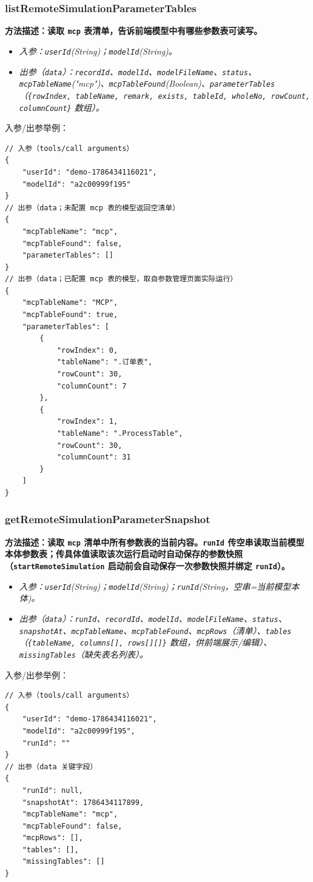 \subsubsection{listRemoteSimulationParameterTables}
\bf{方法描述}：读取 \texttt{mcp} 表清单，告诉前端模型中有哪些参数表可读写。
\begin{itemize}
	\item \it{入参}：\texttt{userId}(String)；\texttt{modelId}(String)。
	\item \it{出参}（\texttt{data}）：\texttt{recordId}、\texttt{modelId}、\texttt{modelFileName}、\texttt{status}、\texttt{mcpTableName}("mcp")、\texttt{mcpTableFound}(Boolean)、\texttt{parameterTables}（\texttt{\{rowIndex, tableName, remark, exists, tableId, wholeNo, rowCount, columnCount\}} 数组）。
\end{itemize}
入参/出参举例：
\begin{lstlisting}
// 入参（tools/call arguments）
{
    "userId": "demo-1786434116021",
    "modelId": "a2c00999f195"
}
// 出参（data；未配置 mcp 表的模型返回空清单）
{
    "mcpTableName": "mcp",
    "mcpTableFound": false,
    "parameterTables": []
}
// 出参（data；已配置 mcp 表的模型，取自参数管理页面实际运行）
{
    "mcpTableName": "MCP",
    "mcpTableFound": true,
    "parameterTables": [
        {
            "rowIndex": 0,
            "tableName": ".订单表",
            "rowCount": 30,
            "columnCount": 7
        },
        {
            "rowIndex": 1,
            "tableName": ".ProcessTable",
            "rowCount": 30,
            "columnCount": 31
        }
    ]
}
\end{lstlisting}\vspace{-30pt}

\subsubsection{getRemoteSimulationParameterSnapshot}
\bf{方法描述}：读取 \texttt{mcp} 清单中所有参数表的当前内容。\texttt{runId} 传空串读取当前模型本体参数表；传具体值读取该次运行启动时自动保存的参数快照（\texttt{startRemoteSimulation} 启动前会自动保存一次参数快照并绑定 \texttt{runId}）。
\begin{itemize}
	\item \it{入参}：\texttt{userId}(String)；\texttt{modelId}(String)；\texttt{runId}(String，空串=当前模型本体)。
	\item \it{出参}（\texttt{data}）：\texttt{runId}、\texttt{recordId}、\texttt{modelId}、\texttt{modelFileName}、\texttt{status}、\texttt{snapshotAt}、\texttt{mcpTableName}、\texttt{mcpTableFound}、\texttt{mcpRows}（清单）、\texttt{tables}（\texttt{\{tableName, columns[], rows[][]\}} 数组，供前端展示/编辑）、\texttt{missingTables}（缺失表名列表）。
\end{itemize}
入参/出参举例：
\begin{lstlisting}
// 入参（tools/call arguments）
{
    "userId": "demo-1786434116021",
    "modelId": "a2c00999f195",
    "runId": ""
}
// 出参（data 关键字段）
{
    "runId": null,
    "snapshotAt": 1786434117899,
    "mcpTableName": "mcp",
    "mcpTableFound": false,
    "mcpRows": [],
    "tables": [],
    "missingTables": []
}
\end{lstlisting}\vspace{-30pt}

